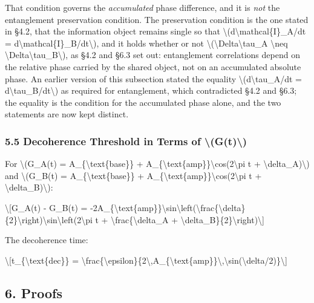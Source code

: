 \documentclass[
  10pt,
]{article}
\begin{document}
That condition governs the \emph{accumulated} phase difference, and it
is \emph{not} the entanglement preservation condition. The preservation
condition is the one stated in §4.2, that the information object remains
single so that \textbackslash(d\textbackslash mathcal\{I\}\_A/dt =
d\textbackslash mathcal\{I\}\_B/dt\textbackslash), and it holds whether
or not \textbackslash(\textbackslash Delta\textbackslash tau\_A
\textbackslash neq
\textbackslash Delta\textbackslash tau\_B\textbackslash), as §4.2 and
§6.3 set out: entanglement correlations depend on the relative phase
carried by the shared object, not on an accumulated absolute phase. An
earlier version of this subsection stated the equality
\textbackslash(d\textbackslash tau\_A/dt =
d\textbackslash tau\_B/dt\textbackslash) as required for entanglement,
which contradicted §4.2 and §6.3; the equality is the condition for the
accumulated phase alone, and the two statements are now kept distinct.

\hypertarget{decoherence-threshold-in-terms-of-gt}{%
\subsubsection{5.5 Decoherence Threshold in Terms of
\textbackslash(G(t)\textbackslash)}\label{decoherence-threshold-in-terms-of-gt}}

For \textbackslash(G\_A(t) = A\_\{\textbackslash text\{base\}\} +
A\_\{\textbackslash text\{amp\}\}\textbackslash cos(2\textbackslash pi t
+ \textbackslash delta\_A)\textbackslash) and \textbackslash(G\_B(t) =
A\_\{\textbackslash text\{base\}\} +
A\_\{\textbackslash text\{amp\}\}\textbackslash cos(2\textbackslash pi t
+ \textbackslash delta\_B)\textbackslash):

\textbackslash{[}G\_A(t) - G\_B(t) =
-2A\_\{\textbackslash text\{amp\}\}\textbackslash sin\textbackslash left(\textbackslash frac\{\textbackslash delta\}\{2\}\textbackslash right)\textbackslash sin\textbackslash left(2\textbackslash pi
t + \textbackslash frac\{\textbackslash delta\_A +
\textbackslash delta\_B\}\{2\}\textbackslash right)\textbackslash{]}

The decoherence time:

\textbackslash{[}t\_\{\textbackslash text\{dec\}\} =
\textbackslash frac\{\textbackslash epsilon\}\{2\textbackslash,A\_\{\textbackslash text\{amp\}\}\textbackslash,\textbar\textbackslash sin(\textbackslash delta/2)\textbar\}\textbackslash{]}

\hypertarget{proofs}{%
\subsection{6. Proofs}\label{proofs}}
\end{document}
